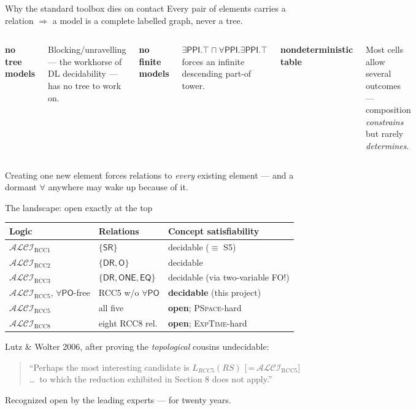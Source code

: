 \documentclass[aspectratio=169,11pt]{beamer}
\newcommand{\ALCIRCC}[1]{\mathcal{ALCI}_{\mathrm{RCC#1}}}
\newcommand{\DR}{\mathsf{DR}}
\newcommand{\PO}{\mathsf{PO}}
\newcommand{\PPI}{\mathsf{PPI}}
\newcommand{\EQ}{\mathsf{EQ}}
\newcommand{\EXPTIME}{\textsc{ExpTime}}
\newcommand{\PSPACE}{\textsc{PSpace}}
\begin{document}
\begin{frame}{Why the standard toolbox dies on contact}
Every pair of elements carries a relation $\Rightarrow$ a model is a
\alert{complete labelled graph}, never a tree.
\vfill
\begin{columns}[T]
\begin{center}\textbf{no tree models}\end{center}
Blocking/unravelling --- the workhorse of DL decidability --- has no tree
to work on.
\begin{center}\textbf{no finite models}\end{center}
$\exists\PPI.\top \sqcap \forall\PPI.\exists\PPI.\top$ forces an infinite
descending part-of tower.
\begin{center}\textbf{nondeterministic table}\end{center}
Most cells allow several outcomes --- composition \emph{constrains} but
rarely \emph{determines}.
\end{columns}
\vfill
\begin{center}
\alert{Creating one new element forces relations to \emph{every} existing
element} --- and a dormant $\forall$ anywhere may wake up because of it.
\end{center}
\end{frame}

\begin{frame}{The landscape: open exactly at the top}
\begin{center}
\small
\begin{tabular}{lll}
\toprule
Logic & Relations & Concept satisfiability\\
\midrule
$\ALCIRCC{1}$ & $\{\mathsf{SR}\}$ & decidable ($\equiv$ S5)\\
$\ALCIRCC{2}$ & $\{\DR,\mathsf{O}\}$ & decidable\\
$\ALCIRCC{3}$ & $\{\DR,\mathsf{ONE},\EQ\}$ & decidable \hfill {\footnotesize(via two-variable FO!)}\\
\rowcolor{petrol!12}
$\ALCIRCC{5}$, $\forall\PO$-free & RCC5 w/o $\forall\PO$ & \textbf{decidable} \hfill {\footnotesize(this project)}\\
\rowcolor{openc!15}
$\ALCIRCC{5}$ & all five & \textbf{open}; \PSPACE-hard\\
\rowcolor{openc!15}
$\ALCIRCC{8}$ & eight RCC8 rel. & \textbf{open}; \EXPTIME-hard\\
\bottomrule
\end{tabular}
\end{center}
\vfill
Lutz \& Wolter 2006, after proving the \emph{topological} cousins undecidable:
\begin{quote}
``Perhaps the most interesting candidate is $L_{RCC5}(RS)$ [\,=\,$\ALCIRCC{5}$]
\dots\ to which the reduction exhibited in Section 8 does not apply.''
\end{quote}
Recognized open by the leading experts --- for \alert{twenty years}.
\end{frame}
\end{document}
